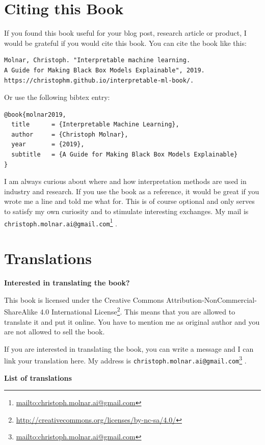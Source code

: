 \documentclass[12pt,]{krantz}
\renewcommand{\href}[2]{#2\footnote{\url{#1}}}
\begin{document}
\chapter{Citing this Book}\label{cite}

If you found this book useful for your blog post, research article or
product, I would be grateful if you would cite this book. You can cite
the book like this:

\begin{verbatim}
Molnar, Christoph. "Interpretable machine learning.
A Guide for Making Black Box Models Explainable", 2019.
https://christophm.github.io/interpretable-ml-book/.
\end{verbatim}

Or use the following bibtex entry:

\begin{verbatim}
@book{molnar2019,
  title      = {Interpretable Machine Learning},
  author     = {Christoph Molnar},
  year       = {2019},
  subtitle   = {A Guide for Making Black Box Models Explainable}
}
\end{verbatim}

I am always curious about where and how interpretation methods are used
in industry and research. If you use the book as a reference, it would
be great if you wrote me a line and told me what for. This is of course
optional and only serves to satisfy my own curiosity and to stimulate
interesting exchanges. My mail is
\href{mailto:christoph.molnar.ai@gmail.com}{\nolinkurl{christoph.molnar.ai@gmail.com}}
.

\chapter{Translations}\label{translations}

\textbf{Interested in translating the book?}

This book is licensed under the
\href{http://creativecommons.org/licenses/by-nc-sa/4.0/}{Creative
Commons Attribution-NonCommercial-ShareAlike 4.0 International License}.
This means that you are allowed to translate it and put it online. You
have to mention me as original author and you are not allowed to sell
the book.

If you are interested in translating the book, you can write a message
and I can link your translation here. My address is
\href{mailto:christoph.molnar.ai@gmail.com}{\nolinkurl{christoph.molnar.ai@gmail.com}}
.

\textbf{List of translations}
\end{document}
